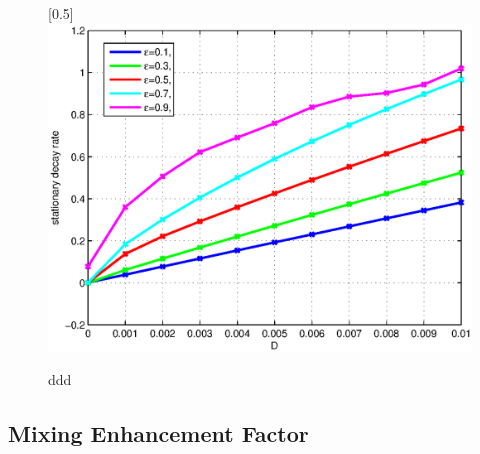 \begin{figure}
 \centerline{
  \scalebox{0.5}[0.5]{\includegraphics{Dvslambda.eps}}
} \caption{ddd}
  \label{Dvslambda}
\end{figure}


\subsection{Mixing Enhancement Factor}

%


